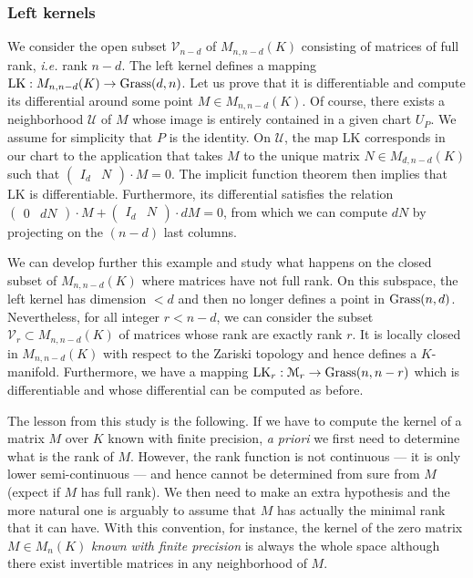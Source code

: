 \documentclass{lms}
\begin{document}
\subsubsection*{Left kernels}

We consider the open subset $\mathcal V_{n-d}$ of $M_{n,n-d}(K)$ 
consisting of matrices of full rank, \emph{i.e.} rank $n-d$. The left 
kernel defines a mapping $\text{LK} : M_{n,n-d}(K) \to \text{\rm Grass}(d,n)$. Let 
us prove that it is differentiable and compute its differential around 
some point $M \in M_{n,n-d}(K)$. Of course, there exists a neighborhood 
$\mathcal U$ of $M$ whose image is entirely contained in a given chart 
$U_P$. We assume for simplicity that $P$ is the identity. On $\mathcal 
U$, the map $\text{LK}$ corresponds in our chart to the application that 
takes $M$ to the unique matrix $N \in M_{d, n-d}(K)$ such that 
$\begin{pmatrix} I_d & N \end{pmatrix} \cdot M = 0$. The implicit 
function theorem then implies that $\text{LK}$ is differentiable. 
Furthermore, its differential satisfies the relation
$\begin{pmatrix} 0 & dN \end{pmatrix} \cdot M +
\begin{pmatrix} I_d & N \end{pmatrix} \cdot dM = 0$,
from which we can compute $dN$ by projecting on the $(n-d)$ last
columns.

We can develop further this example and study what happens on the 
closed subset of $M_{n,n-d}(K)$ where matrices have not full rank. On
this subspace, the left kernel has dimension $< d$ and then no longer
defines a point in $\text{\rm Grass}(n,d)$. Nevertheless, for all integer $r <
n-d$, we can consider the subset $\mathcal V_r \subset M_{n,n-d}(K)$
of matrices whose rank are exactly rank $r$. It is locally closed in
$M_{n,n-d}(K)$ with respect to the Zariski topology and hence defines
a $K$-manifold. Furthermore, we have a mapping $\text{LK}_r : \mathcal 
M_r \to \Grass(n,n-r)$ which is differentiable and whose differential 
can be computed as before.

The lesson from this study is the following. If we have to compute the 
kernel of a matrix $M$ over $K$ known with finite precision, \emph{a 
priori} we first need to determine what is the rank of $M$. However, the 
rank function is not continuous --- it is only lower semi-continuous --- 
and hence cannot be determined from sure from $M$ (expect if $M$ has 
full rank). We then need to make an extra hypothesis and the more natural 
one is arguably to assume that $M$ has actually the minimal rank that it 
can have. With this convention, for instance, the kernel of the zero 
matrix $M \in M_n(K)$ \emph{known with finite precision} is always the 
whole space although there exist invertible matrices in any 
neighborhood of $M$.
\end{document}

